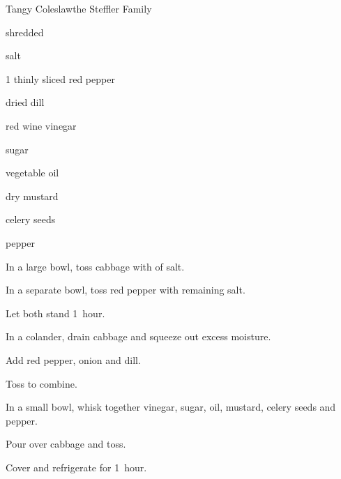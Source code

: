\begin{recipe}{Tangy Coleslaw}{the Steffler Family}{}

\begin{ingredients}
\item {} shredded 
\item \tp{1\quarter} salt
\item 1 thinly sliced red pepper
\item {} dried dill
\item \C{\quarter} red wine vinegar
\item {} sugar
\item {} vegetable oil
\item {} dry mustard
\item \tp{\threequarter} celery seeds
\item \tp{\quarter} pepper
\end{ingredients}

\begin{directions}
\item In a large bowl, toss cabbage with  of salt.
\item In a separate bowl, toss red pepper with remaining salt.
\item Let both stand 1~hour.
\item In a colander, drain cabbage and squeeze out excess moisture.
\item Add red pepper, onion and dill.
\item Toss to combine.
\item In a small bowl, whisk together vinegar, sugar, oil, mustard, celery seeds and pepper.
\item Pour over cabbage and toss.
\item Cover and refrigerate for 1~hour.
\end{directions}

\end{recipe}
